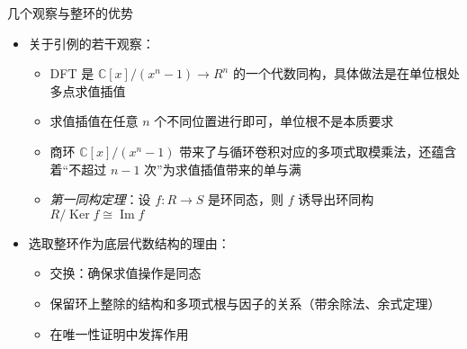 \documentclass[
  ignorenonframetext,
  chinese-hans,
]{beamer}
\providecommand{\tightlist}{%
  \setlength{\itemsep}{0pt}\setlength{\parskip}{0pt}}\usepackage{longtable,booktabs,array}
\theoremstyle{plain}
\theoremstyle{plain}
\theoremstyle{plain}
\theoremstyle{plain}
\theoremstyle{remark}
\begin{document}
\begin{frame}{几个观察与整环的优势}
\label{ux51e0ux4e2aux89c2ux5bdfux4e0eux6574ux73afux7684ux4f18ux52bf}
\begin{itemize}
\item
  关于引例的若干观察：

  \begin{itemize}
  \item
    DFT 是 \(\mathbb C[x] / (x^n-1) \to R^n\)
    的一个代数同构，具体做法是在单位根处多点求值插值
  \item
    求值插值在任意 \(n\) 个不同位置进行即可，单位根不是本质要求
  \item
    商环 \(\mathbb C[x] / (x^n-1)\)
    带来了与循环卷积对应的多项式取模乘法，还蕴含着``不超过 \(n-1\)
    次''为求值插值带来的单与满
  \item
    \emph{第一同构定理}：设 \(f: R \to S\) 是环同态，则 \(f\)
    诱导出环同构 \(R / \operatorname{Ker}f \cong \operatorname{Im}f\)
  \end{itemize}
\item
  选取整环作为底层代数结构的理由：

  \begin{itemize}
  \tightlist
  \item
    交换：确保求值操作是同态
  \item
    保留环上整除的结构和多项式根与因子的关系（带余除法、余式定理）
  \item
    在唯一性证明中发挥作用
  \end{itemize}
\end{itemize}
\end{frame}
\end{document}
